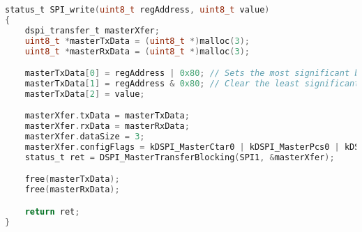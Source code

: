 \begin{lstlisting}[language=c,caption=Problem 4 SPI\_write, label=list:p4_spi_write]
status_t SPI_write(uint8_t regAddress, uint8_t value)
{
    dspi_transfer_t masterXfer;
    uint8_t *masterTxData = (uint8_t *)malloc(3);
    uint8_t *masterRxData = (uint8_t *)malloc(3);

    masterTxData[0] = regAddress | 0x80; // Sets the most significant bit (enable write)
    masterTxData[1] = regAddress & 0x80; // Clear the least significant 7 bits
    masterTxData[2] = value;

    masterXfer.txData = masterTxData;
    masterXfer.rxData = masterRxData;
    masterXfer.dataSize = 3;
    masterXfer.configFlags = kDSPI_MasterCtar0 | kDSPI_MasterPcs0 | kDSPI_MasterPcsContinuous;
    status_t ret = DSPI_MasterTransferBlocking(SPI1, &masterXfer);

    free(masterTxData);
    free(masterRxData);

    return ret;
}
\end{lstlisting}